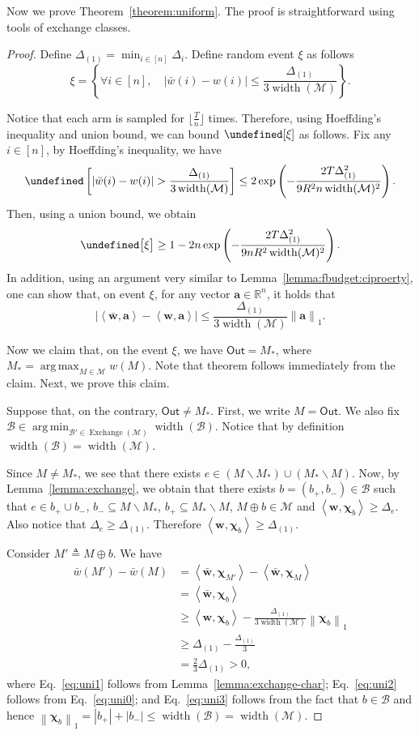 \documentclass{article}
\newcommand{\M}{\mathcal M}
\newcommand{\B}{\mathcal B}
\newcommand{\del}{\backslash}
\newcommand{\RR}{\mathbb R}
\DeclareMathOperator{\rank}{width}
\DeclareMathOperator*{\argmax}{arg\,max}
\DeclareMathOperator*{\argmin}{arg\,min}
\DeclareMathOperator{\Exchange}{Exchange}
\newcommand{\out}{\mathsf{Out}}
\let\Pr\undefined
\DeclareMathOperator{\Pr}{Pr}
\newcommand{\inn}[1]{\left\langle #1 \right\rangle}
\newcommand{\nor}[1]{\left\|#1\right\|}
\renewcommand{\vec}[1]{\boldsymbol{#1}}
\begin{document}
Now we prove Theorem~\ref{theorem:uniform}. 
The proof is straightforward using tools of exchange classes.
\begin{proof}
Define $\Delta_{(1)} = \min_{i\in [n]} \Delta_{i}$.
Define random event $\xi$ as follows
$$
\xi = \left\{ \forall i\in [n], \quad |\bar w(i) - w(i)| \le \frac{\Delta_{(1)}}{3\rank(\M)} \right\}.
$$

Notice that each arm is sampled for $\lfloor \frac{T}{n} \rfloor$ times. 
Therefore, using Hoeffding's inequality and union bound, we can bound $\Pr[\xi]$ as follows.
Fix any $i\in[n]$, by Hoeffding's inequality, we have
$$
\Pr\left[ |\bar w(i)-w(i)| > \frac{\Delta_{(1)}}{3\rank(\M)} \right] 
\le 2\exp\left(-\frac{2T\Delta_{(1)}^2}{9R^2n\rank(\M)^2} \right).
$$
Then, using a union bound, we obtain
$$
\Pr\big[\xi \big] \ge 1-2n\exp\left(-\frac{2T\Delta_{(1)}^2}{9nR^2\rank(\M)^2} \right).
$$
In addition, using an argument very similar to Lemma~\ref{lemma:fbudget:ciproerty}, one can show that, on event $\xi$, for any vector $\vec a \in \RR^n$, it holds that 
\begin{equation}
\label{eq:uni0}
|\inn{\vec{\bar w}, \vec a}-\inn{\vec{w}, \vec a}|\le \frac{\Delta_{(1)}}{3\rank(\M)}\nor{\vec a}_1.
\end{equation}

Now we claim that, on the event $\xi$, we have $\out=M_*$, where $M_*=\argmax_{M\in \M} w(M)$.
Note that theorem follows immediately from the claim. 
Next, we prove this claim.


Suppose that, on the contrary, $\out\not=M_*$.
First, we write $M = \out$.
We also fix $\B\in\argmin_{\B'\in\Exchange(\M)} \rank(\B)$.
Notice that by definition $\rank(\B) = \rank(\M)$.

Since $M\not=M_*$, we see that there exists $e\in (M\del M_*) \cup (M_*\del M)$. 
Now, by Lemma~\ref{lemma:exchange}, we obtain that 
there exists $b=(b_+,b_-) \in \B$ such that $e\in b_+\cup b_-$, $b_- \subseteq M\del M_*$, $b_+\subseteq M_* \del M$,
$M \oplus b \in \M$ and $\inn{\vec w, \vec\chi_b} \ge \Delta_e$. Also notice that $\Delta_e \ge \Delta_{(1)}$. Therefore $\inn{\vec w,\vec\chi_b} \ge \Delta_{(1)}$.

Consider $M'\triangleq M\oplus b$. We have
\begin{align}
\bar w(M')-\bar w(M) &= \inn{\vec{\bar w}, \vec \chi_{M'}}-\inn{\vec{\bar w}, \vec \chi_{M}} \nonumber\\
                     &=\inn{\vec{\bar w}, \vec \chi_{b}} \label{eq:uni1} \\
                     &\ge \inn{\vec{w}, \vec \chi_{b}}-\frac{\Delta_{(1)}}{3\rank(\M)} \nor{\vec\chi_{b}}_1 \label{eq:uni2}\\
                     &\ge \Delta_{(1)} - \frac{\Delta_{(1)}}{3}\label{eq:uni3}\\
                     &= \frac{2}{3} \Delta_{(1)} > 0,
\end{align}
where Eq.~\eqref{eq:uni1} follows from Lemma~\ref{lemma:exchange-char}; Eq.~\eqref{eq:uni2} follows from Eq.~\eqref{eq:uni0}; and Eq.~\eqref{eq:uni3} follows from the fact that $b\in \B$ and hence $\nor{\vec\chi_b}_1 = |b_+|+|b_-| \le \rank(\B) = \rank(\M)$.


\end{proof}
\end{document}

